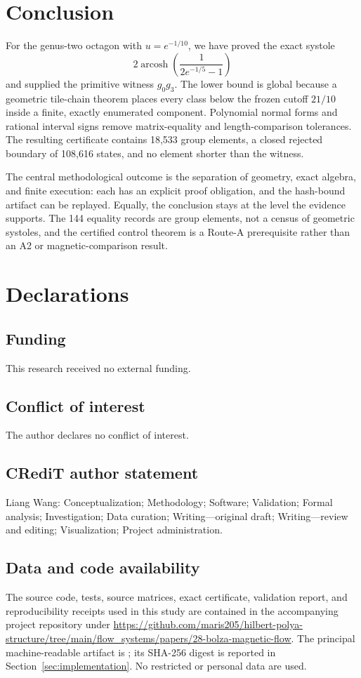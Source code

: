 \documentclass[11pt,a4paper]{article}
\theoremstyle{definition}
\newcommand{\arcosh}{\operatorname{arcosh}}
\begin{document}
\section{Conclusion}

For the genus-two octagon with \(u=e^{-1/10}\), we have proved the exact
systole
\[
 2\arcosh\!\left(\frac{1}{2e^{-1/5}-1}\right)
\]
and supplied the primitive witness \(g_0g_3\).  The lower bound is global
because a geometric tile-chain theorem places every class below the frozen
cutoff \(21/10\) inside a finite, exactly enumerated component.  Polynomial
normal forms and rational interval signs remove matrix-equality and
length-comparison tolerances.  The resulting certificate contains 18,533
group elements, a closed rejected boundary of 108,616 states, and no element
shorter than the witness.

The central methodological outcome is the separation of geometry, exact
algebra, and finite execution: each has an explicit proof obligation, and the
hash-bound artifact can be replayed.  Equally, the conclusion stays at the
level the evidence supports.  The 144 equality records are group elements,
not a census of geometric systoles, and the certified control theorem is a
Route-A prerequisite rather than an A2 or magnetic-comparison result.

\section*{Declarations}

\subsection*{Funding}
This research received no external funding.

\subsection*{Conflict of interest}
The author declares no conflict of interest.

\subsection*{CRediT author statement}
Liang Wang: Conceptualization; Methodology; Software; Validation; Formal
analysis; Investigation; Data curation; Writing---original draft;
Writing---review and editing; Visualization; Project administration.

\subsection*{Data and code availability}
The source code, tests, source matrices, exact certificate, validation report,
and reproducibility receipts used in this study are contained in the
accompanying project repository under
\url{https://github.com/maris205/hilbert-polya-structure/tree/main/flow_systems/papers/28-bolza-magnetic-flow}.
The principal machine-readable artifact is
; its SHA-256
digest is reported in Section~\ref{sec:implementation}.  No restricted or
personal data are used.
\end{document}
